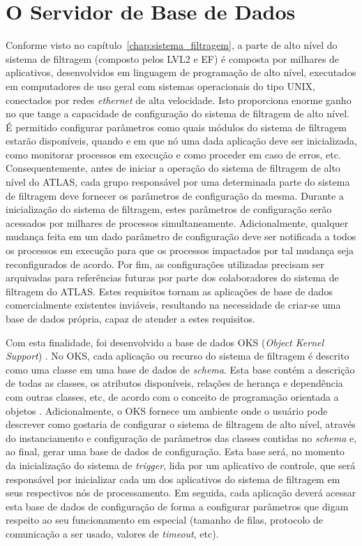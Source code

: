 \section{O Servidor de Base de Dados}
\label{sec:oks}

Conforme visto no capítulo~\ref{chap:sistema_filtragem}, a parte de alto nível do sistema de filtragem (composto pelos LVL2 e EF) é composta por milhares de aplicativos, desenvolvidos em linguagem de programação de alto nível, executados em computadores de uso geral com sistemas operacionais do tipo UNIX, conectados por redes \emph{ethernet} de alta velocidade. Isto proporciona enorme ganho no que tange a capacidade de configuração do sistema de filtragem de alto nível. É permitido configurar parâmetros como quais módulos do sistema de filtragem estarão disponíveis, quando e em que nó uma dada aplicação deve ser inicializada, como monitorar processos em execução e como proceder em caso de erros, etc. Consequentemente, antes de iniciar a operação do sistema de filtragem de alto nível do ATLAS, cada grupo responsável por uma determinada parte do sistema de filtragem deve fornecer os parâmetros de configuração da mesma. Durante a inicialização do sistema de filtragem, estes parâmetros de configuração serão acessados por milhares de processos simultaneamente. Adicionalmente, qualquer mudança feita em um dado parâmetro de configuração deve ser notificada a todos os processos em execução para que os processos impactados por tal mudança seja reconfigurados de acordo. Por fim, as configurações utilizadas precisam ser arquivadas para referências futuras por parte dos colaboradores do sistema de filtragem do ATLAS. Estes requisitos  tornam as aplicações de base de dados comercialmente existentes inviáveis, resultando na necessidade de criar-se uma base de dados própria, capaz de atender a estes requisitos. 

Com esta finalidade, foi desenvolvido a base de dados OKS (\emph{Object Kernel Support}) \cite{bib:oks}. No OKS, cada aplicação ou recurso do sistema de filtragem é descrito como uma classe em uma base de dados de \emph{schema}. Esta base contém a descrição de todas as classes, os atributos disponíveis, relações de herança e dependência com outras classes, etc, de acordo com o conceito de programação orientada a objetos \cite{bib:poo}. Adicionalmente, o OKS fornece um ambiente onde o usuário pode descrever como gostaria de configurar o sistema de filtragem de alto nível, através do instanciamento e configuração de parâmetros das classes contidas no \emph{schema} e, ao final, gerar uma base de dados de configuração. Esta base será, no momento da inicialização do sistema de \emph{trigger}, lida por um aplicativo de controle, que será responsável por inicializar cada um dos aplicativos do sistema de filtragem em seus respectivos nós de processamento. Em seguida, cada aplicação deverá acessar esta base de dados de configuração de forma a configurar parâmetros que digam respeito ao seu funcionamento em especial (tamanho de filas, protocolo de comunicação a ser usado, valores de \emph{timeout}, etc).  

